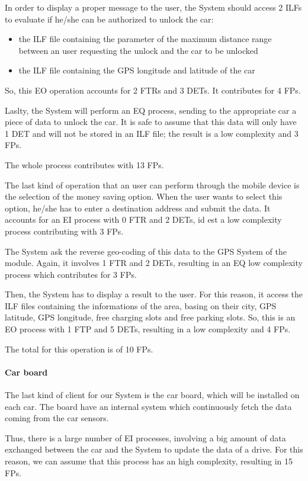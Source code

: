 In order to display a proper message to the user, the System should access 2 ILFs to evaluate if he/she can be authorized to unlock the car:
\begin{itemize}
	\item the ILF file containing the parameter of the maximum distance range between an user requesting the unlock and the car to be unlocked
	\item the ILF file containing the GPS longitude and latitude of the car
\end{itemize}
So, this EO operation accounts for 2 FTRs and 3 DETs. It contributes for 4 FPs.

Laslty, the System will perform an EQ process, sending to the appropriate car a piece of data to unlock the car. It is safe to assume that this data will only have 1 DET and will not be stored in an ILF file; the result is a low complexity and 3 FPs.

The whole process contributes with 13 FPs.
\bigskip

The last kind of operation that an user can perform through the mobile device is the selection of the money saving option.
When the user wants to select this option, he/she has to enter a destination address and submit the data. It accounts for an EI process with 0 FTR and 2 DETs, id est a low complexity process contributing with 3 FPs.

The System ask the reverse geo-coding of this data to the GPS System of the module. Again, it involves 1 FTR and 2 DETs, resulting in an EQ low complexity process which contributes for 3 FPs.

Then, the System has to display a result to the user. For this reason, it access the ILF files containing the informations of the area, basing on their city, GPS latitude, GPS longitude, free charging slots and free parking slots. So, this is an EO process with 1 FTP and 5 DETs, resulting in a low complexity and 4 FPs.

The total for this operation is of 10 FPs.

\paragraph{Car board}
The last kind of client for our System is the car board, which will be installed on each car. The board have an internal system which continuously fetch the data coming from the car sensors. 

Thus, there is a large number of EI processes, involving a big amount of data exchanged between the car and the System to update the data of a drive. For this reason, we can assume that this process has an high complexity, resulting in 15 FPs.

